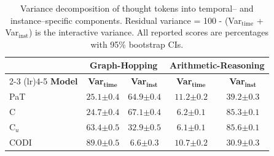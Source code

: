 \begin{table}[!h]
\centering
\tiny
\setlength{\tabcolsep}{3pt}
\caption{Variance decomposition of thought tokens into temporal-- and instance--specific components. Residual variance = 100 - (Var$_\text{time}$ + Var$_\text{inst}$) is the interactive variance. All reported scores are percentages with 95\% bootstrap CIs.}
\label{tab:variance_decomposition}
\begin{tabular}{l cc | cc}
\toprule
& \multicolumn{2}{c}{\textbf{Graph-Hopping}} & \multicolumn{2}{c}{\textbf{Arithmetic-Reasoning}} \\
\cmidrule(lr){2-3} \cmidrule(lr){4-5}
\textbf{Model} & \textbf{Var}$_\textbf{time}$ & \textbf{Var}$_\textbf{inst}$ & \textbf{Var}$_\textbf{time}$ & \textbf{Var}$_\textbf{inst}$ \\
\midrule
PaT & $25.1 {\scriptstyle \pm 0.4}$ & $64.9 {\scriptstyle \pm 0.4}$ & $11.2 {\scriptstyle \pm 0.2}$ & $39.2 {\scriptstyle \pm 0.3}$ \\
\midrule
C & $24.7 {\scriptstyle \pm 0.4}$ & $67.1 {\scriptstyle \pm 0.4}$ & $6.2 {\scriptstyle \pm 0.1}$ & $85.3 {\scriptstyle \pm 0.1}$ \\
\midrule
C$_u$ & $63.4 {\scriptstyle \pm 0.5}$ & $32.9 {\scriptstyle \pm 0.5}$ & $6.1 {\scriptstyle \pm 0.1}$ & $85.6 {\scriptstyle \pm 0.1}$ \\
\midrule
CODI & $89.0 {\scriptstyle \pm 0.5}$ & $6.6 {\scriptstyle \pm 0.3}$ & $10.7 {\scriptstyle \pm 0.2}$ & $30.9 {\scriptstyle \pm 0.3}$ \\
\bottomrule
\end{tabular}
\end{table}
